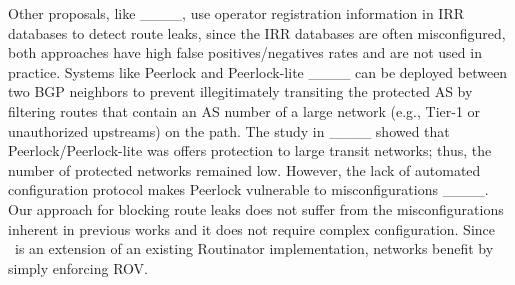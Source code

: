 {%
Other proposals, like ____, use operator registration information in IRR databases to detect route leaks, since the IRR databases are often misconfigured, both approaches have high false positives/negatives rates and are not used in practice.
Systems like Peerlock and Peerlock-lite ____ can be deployed between two BGP neighbors to prevent illegitimately transiting the protected AS by filtering routes that contain an AS number of a large network (e.g., Tier-1 or unauthorized upstreams) on the path. The study in ____ showed that Peerlock/Peerlock-lite was offers protection to large transit networks; thus, the number of protected networks remained low. However, the lack of automated configuration protocol makes Peerlock vulnerable to misconfigurations ____. Our approach for blocking route leaks does not suffer from the misconfigurations inherent in previous works and it does not require complex configuration. Since \lov\ is an extension of an existing Routinator implementation, networks benefit by simply enforcing ROV. 
}

